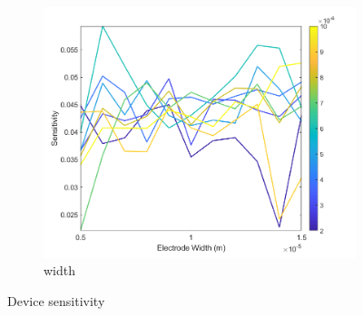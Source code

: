 \begin{figure}[h]
\begin{subfigure}[b]{0.49\textwidth}
        \centering
        \includegraphics[width=\textwidth]{images/comsol_device_widthXsensitivity.png}
        \caption{width}
    \end{subfigure}
    \caption[Device sensitivity]{Device sensitivity}
    \label{fig:device_sensitivity}
\end{figure}

